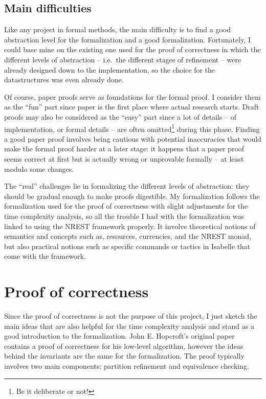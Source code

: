 \documentclass[12pt, a4 paper]{article}
\theoremstyle{definition}
\begin{document}
\subsection{Main difficulties}

Like any project in formal methods, the main difficulty is to find a good abstraction level for the formalization and a good formalization. Fortunately, I could base mine on the existing one used for the proof of correctness in which the different levels of abstraction -- i.e.\ the different stages of refinement -- were already designed down to the implementation, so the choice for the datastructures was even already done.

Of course, paper proofs serve as foundations for the formal proof. I consider them as the ``fun'' part since paper is the first place where actual research starts. Draft proofs may also be considered as the ``easy'' part since a lot of details -- of implementation, or formal details -- are often omitted\footnote{Be it deliberate or not!} during this phase. Finding a good paper proof involves being cautious with potential inaccuracies that would make the formal proof harder at a later stage: it happens that a paper proof seems correct at first but is actually wrong or unprovable formally -- at least modulo some changes.

The ``real'' challenges lie in formalizing the different levels of abstraction: they should be gradual enough to make proofs digestible. My formalization follows the formalization used for the proof of correctness with slight adjustments for the time complexity analysis, so all the trouble I had with the formalization was linked to using the NREST framework properly. It involve theoretical notions of semantics and concepts such as, resources, currencies, and the NREST monad, but also practical notions such as specific commands or tactics in Isabelle that come with the framework.


\section{Proof of correctness}

Since the proof of correctness is not the purpose of this project, I just sketch the main ideas that are also helpful for the time complexity analysis and stand as a good introduction to the formalization.
John E. Hopcroft's original paper \cite{Hop71} contains a proof of correctness for his low-level algorithm, however the ideas behind the invariants are the same for the formalization.
The proof typically involves two main components: partition refinement and equivalence checking.
\end{document}
